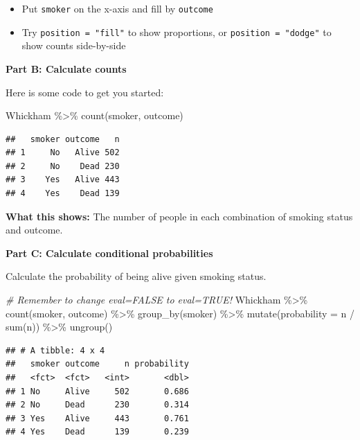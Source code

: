 \documentclass[]{tufte-handout}
\newenvironment{Shaded}{}{}
\newcommand{\AttributeTok}[1]{\textcolor[rgb]{0.49,0.56,0.16}{#1}}
\newcommand{\CommentTok}[1]{\textcolor[rgb]{0.38,0.63,0.69}{\textit{#1}}}
\newcommand{\FunctionTok}[1]{\textcolor[rgb]{0.02,0.16,0.49}{#1}}
\newcommand{\NormalTok}[1]{#1}
\newcommand{\SpecialCharTok}[1]{\textcolor[rgb]{0.25,0.44,0.63}{#1}}
\providecommand{\tightlist}{%
  \setlength{\itemsep}{0pt}\setlength{\parskip}{0pt}}
\begin{document}
\begin{itemize}
\tightlist
\item
  Put \texttt{smoker} on the x-axis and fill by \texttt{outcome}
\item
  Try \texttt{position\ =\ "fill"} to show proportions, or
  \texttt{position\ =\ "dodge"} to show counts side-by-side
\end{itemize}

\textbf{Part B: Calculate counts}

Here is some code to get you started:

\begin{Shaded}
\begin{Highlighting}[]
\NormalTok{Whickham }\SpecialCharTok{\%\textgreater{}\%}
  \FunctionTok{count}\NormalTok{(smoker, outcome)}
\end{Highlighting}
\end{Shaded}

\begin{verbatim}
##   smoker outcome   n
## 1     No   Alive 502
## 2     No    Dead 230
## 3    Yes   Alive 443
## 4    Yes    Dead 139
\end{verbatim}

\textbf{What this shows:} The number of people in each combination of
smoking status and outcome.

\textbf{Part C: Calculate conditional probabilities}

Calculate the probability of being alive given smoking status.

\begin{Shaded}
\begin{Highlighting}[]
\CommentTok{\# Remember to change eval=FALSE to eval=TRUE!}
\NormalTok{Whickham }\SpecialCharTok{\%\textgreater{}\%}
  \FunctionTok{count}\NormalTok{(smoker, outcome) }\SpecialCharTok{\%\textgreater{}\%}
  \FunctionTok{group\_by}\NormalTok{(smoker) }\SpecialCharTok{\%\textgreater{}\%}
  \FunctionTok{mutate}\NormalTok{(}\AttributeTok{probability =}\NormalTok{ n }\SpecialCharTok{/} \FunctionTok{sum}\NormalTok{(n)) }\SpecialCharTok{\%\textgreater{}\%}
  \FunctionTok{ungroup}\NormalTok{()}
\end{Highlighting}
\end{Shaded}

\begin{verbatim}
## # A tibble: 4 x 4
##   smoker outcome     n probability
##   <fct>  <fct>   <int>       <dbl>
## 1 No     Alive     502       0.686
## 2 No     Dead      230       0.314
## 3 Yes    Alive     443       0.761
## 4 Yes    Dead      139       0.239
\end{verbatim}
\end{document}
